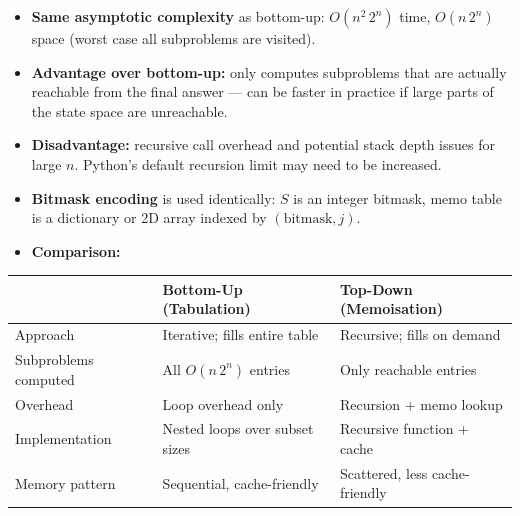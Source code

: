 \documentclass[11pt]{article}
\newcounter{none}
\providecommand{\tightlist}{%
      \setlength{\itemsep}{0pt}\setlength{\parskip}{0pt}}
\begin{document}
\begin{itemize}
\tightlist
\item
  \textbf{Same asymptotic complexity} as bottom-up: \(O(n^2\, 2^n)\)
  time, \(O(n\, 2^n)\) space (worst case all subproblems are visited).
\item
  \textbf{Advantage over bottom-up:} only computes subproblems that are
  actually reachable from the final answer --- can be faster in practice
  if large parts of the state space are unreachable.
\item
  \textbf{Disadvantage:} recursive call overhead and potential stack
  depth issues for large \(n\). Python's default recursion limit may
  need to be increased.
\item
  \textbf{Bitmask encoding} is used identically: \(S\) is an integer
  bitmask, memo table is a dictionary or 2D array indexed by
  \((\text{bitmask}, j)\).
\item
  \textbf{Comparison:}
\end{itemize}

{\def\LTcaptype{none} %
\begin{longtable}[]{@{}
  >{\raggedright\arraybackslash}p{}
  >{\raggedright\arraybackslash}p{}
  >{\raggedright\arraybackslash}p{}@{}}
\toprule\noalign{}
\begin{minipage}[b]{\linewidth}\raggedright
\end{minipage} & \begin{minipage}[b]{\linewidth}\raggedright
Bottom-Up (Tabulation)
\end{minipage} & \begin{minipage}[b]{\linewidth}\raggedright
Top-Down (Memoisation)
\end{minipage} \\
\midrule\noalign{}
\endhead
\bottomrule\noalign{}
\endlastfoot
Approach & Iterative; fills entire table & Recursive; fills on demand \\
Subproblems computed & All \(O(n\, 2^n)\) entries & Only reachable
entries \\
Overhead & Loop overhead only & Recursion + memo lookup \\
Implementation & Nested loops over subset sizes & Recursive function +
cache \\
Memory pattern & Sequential, cache-friendly & Scattered, less
cache-friendly \\
\end{longtable}
}
\end{document}
